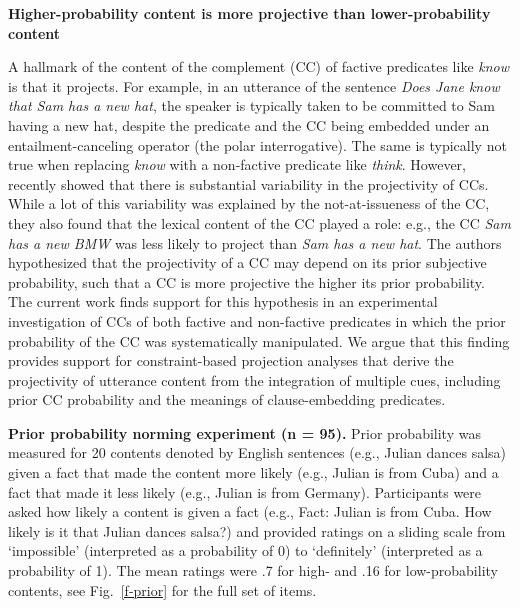 \documentclass[12pt,fleqn]{article}
\newcommand{\6}{\mbox{$[\hspace*{-.6mm}[$}}
\newcommand{\9}{\mbox{$]\hspace*{-.6mm}]$}}
\begin{document}
  
\begin{center}
{\bf Higher-probability content is more projective than lower-probability content}
\end{center}

\vspace*{-.3cm}

\noindent
A hallmark of the content of the complement (CC) of factive predicates like {\em know}  is that it projects. For example, in an utterance of the sentence \emph{Does Jane know that Sam has a new hat}, the speaker is typically taken to be committed to Sam having a new hat, despite the predicate and the CC being embedded under an entailment-canceling operator (the polar interrogative). The same is typically not true when replacing \emph{know} with a non-factive predicate like \emph{think}. However,  \citealt*{tbd-variability}  recently showed that there is substantial variability in the projectivity of CCs. While a lot of this variability was explained by the not-at-issueness of the CC, they also found that the lexical content of the CC played a role: e.g., the CC \emph{Sam has a new BMW} was less likely to project than \emph{Sam has a new hat}. The authors hypothesized that the projectivity of a CC may depend on its prior subjective probability, such that a CC is more projective the higher its prior probability. The current work finds support for this hypothesis in an experimental investigation of CCs of both factive and non-factive predicates in which the prior probability of the CC was systematically manipulated. We argue that this finding provides support for constraint-based projection analyses that derive the projectivity of utterance content from the integration of multiple cues, including prior CC probability and the meanings of clause-embedding predicates.


\noindent
{\bf Prior probability norming experiment (n = 95).} Prior probability was measured for 20 contents denoted by English sentences (e.g., Julian dances salsa) given a fact that made the content more likely (e.g., Julian is from Cuba) and a fact that made it less likely (e.g., Julian is from Germany). Participants were asked how likely a content is given a fact (e.g., Fact: Julian is from Cuba. How likely is it that Julian dances salsa?) and provided ratings on a sliding scale from `impossible' (interpreted as a probability of 0) to `definitely' (interpreted as a probability of 1). The mean ratings were .7 for high- and .16 for low-probability contents, see Fig.~\ref{f-prior} for the full set of items.
\end{document}
